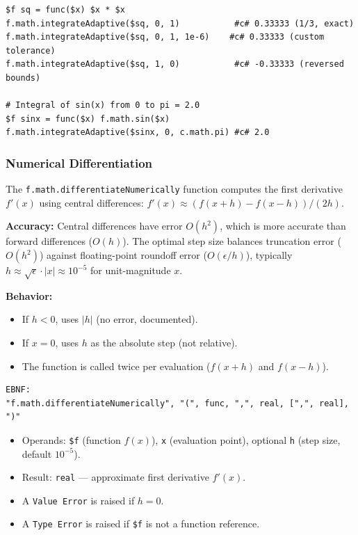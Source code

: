 \begin{verbatim}
$f sq = func($x) $x * $x
f.math.integrateAdaptive($sq, 0, 1)           #c# 0.33333 (1/3, exact)
f.math.integrateAdaptive($sq, 0, 1, 1e-6)    #c# 0.33333 (custom tolerance)
f.math.integrateAdaptive($sq, 1, 0)           #c# -0.33333 (reversed bounds)

# Integral of sin(x) from 0 to pi = 2.0
$f sinx = func($x) f.math.sin($x)
f.math.integrateAdaptive($sinx, 0, c.math.pi) #c# 2.0
\end{verbatim}

\subsubsection{Numerical Differentiation}
The \texttt{f.math.differentiateNumerically} function computes the first derivative $f'(x)$ using central differences: $f'(x) \approx (f(x+h) - f(x-h)) / (2h)$.

\textbf{Accuracy:} Central differences have error $O(h^2)$, which is more accurate than forward differences ($O(h)$). The optimal step size balances truncation error ($O(h^2)$) against floating-point roundoff error ($O(\epsilon/h)$), typically $h \approx \sqrt{\epsilon} \cdot |x| \approx 10^{-5}$ for unit-magnitude $x$.

\textbf{Behavior:}
\begin{itemize}
\item If $h < 0$, uses $|h|$ (no error, documented).
\item If $x = 0$, uses $h$ as the absolute step (not relative).
\item The function is called twice per evaluation ($f(x+h)$ and $f(x-h)$).
\end{itemize}

\begin{verbatim}
EBNF:
"f.math.differentiateNumerically", "(", func, ",", real, [",", real], ")"
\end{verbatim}
\begin{itemize}
\item Operands: \texttt{\$f} (function $f(x)$), \texttt{x} (evaluation point), optional \texttt{h} (step size, default $10^{-5}$).
\item Result: \texttt{real} --- approximate first derivative $f'(x)$.
\item A \texttt{Value Error} is raised if $h = 0$.
\item A \texttt{Type Error} is raised if \texttt{\$f} is not a function reference.
\end{itemize}

